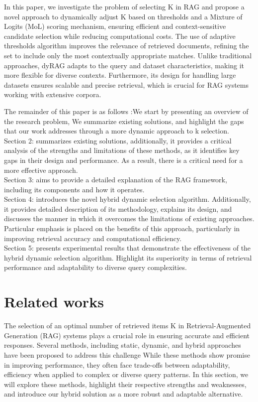 \documentclass[Afour,sageh,times]{sagej}
\begin{document}
In this paper, we investigate the problem of selecting K in RAG and propose a novel approach to dynamically adjust K based on  thresholds and a Mixture of Logits (MoL) \cite{ding2024efficient} scoring mechanism, ensuring efficient and context-sensitive candidate selection while reducing computational costs. The use of  adaptive thresholds algorithm improves the relevance of retrieved documents, refining the set to include only the most contextually appropriate matches. Unlike traditional approaches, dyRAG adapts to the query and dataset characteristics, making it more flexible for diverse contexts. Furthermore, its design for handling large datasets ensures scalable and precise retrieval, which is crucial for RAG systems working with extensive corpora.


The remainder of this paper is as follows :We start by presenting an overview of the research problem,  We summarize existing solutions, and highlight the gaps that our work addresses through a more dynamic approach to k selection.\\
Section 2: summarizes existing solutions, additionally, it provides a critical analysis of the strengths and limitations of these methods, as it identifies key gaps in their design and performance. As a result, there is a critical need for a more effective approach.\\
Section 3: aims to provide a detailed explanation of the RAG framework, including its components and how it operates.\\
Section 4: introduces the novel hybrid dynamic selection algorithm. Additionally, it provides detailed description of its methodology, explains its design, and discusses the manner in which it overcomes the limitations of existing  approaches. Particular emphasis is placed on the benefits of this approach, particularly in improving retrieval accuracy and computational efficiency.\\
Section 5: presents experimental results that demonstrate the effectiveness of the hybrid dynamic selection algorithm. Highlight its superiority in terms of retrieval performance and adaptability to diverse query complexities.

\section{Related works}\label{sec2}
The selection of an optimal number of retrieved items K in Retrieval-Augmented Generation (RAG) systems plays a crucial role in ensuring accurate and efficient responses. Several methods, including static, dynamic, and hybrid approaches have been proposed to address this challenge While these methods show promise in improving performance, they often face trade-offs between adaptability, efficiency when applied to complex or diverse query patterns. In this section, we will explore these methods, highlight their respective strengths and weaknesses, and introduce our hybrid solution as a more robust and adaptable alternative. 
\end{document}
